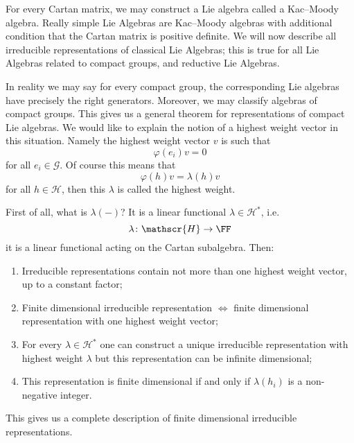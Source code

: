 For every Cartan matrix, we may construct a Lie algebra called a
Kac--Moody algebra. Really %
simple Lie Algebras are Kac--Moody algebras with additional
condition that the Cartan matrix is positive definite. We will
now describe all irreducible representations of classical Lie
Algebras; this is true for all Lie Algebras related to compact
groups, and reductive Lie Algebras.

In reality we may say for every compact group, the corresponding
Lie algebras have precisely the right generators. Moreover, we
may classify algebras of compact groups. This gives us a general
theorem for representations of compact Lie algebras. We would
like to explain the notion of a highest weight vector in this
situation. Namely the highest weight vector $v$ is such that
\begin{equation}
\varphi(e_{i})v = 0
\end{equation}
for all $e_{i}\in\mathscr{G}$. Of course this means that
\begin{equation}
\varphi(h)v = \lambda(h)v
\end{equation}
for all $h\in\mathscr{H}$, then this $\lambda$ is called the
highest weight. 

First of all, what is $\lambda(-)$? It is a linear functional
$\lambda\in\mathscr{H}^{*}$, i.e.
\begin{equation}
\lambda\colon\mathscr{H}\to\FF
\end{equation}
it is a linear functional acting on the Cartan subalgebra. Then:
\begin{enumerate}
\item Irreducible representations contain not more than one
  highest weight vector, up to a constant factor; 
\item Finite dimensional irreducible representation $\iff$ finite
  dimensional representation with one highest weight vector;
\item For every $\lambda\in\mathscr{H}^{*}$ one can construct a
  unique irreducible representation with highest weight $\lambda$
  but this representation can be infinite dimensional;
\item\label{lec16:cartan:mostImportantPoint}
  This representation is finite dimensional if and only if
  $\lambda(h_{i})$ is a non-negative integer.
\end{enumerate}
This gives us a complete description of finite dimensional
irreducible representations.

